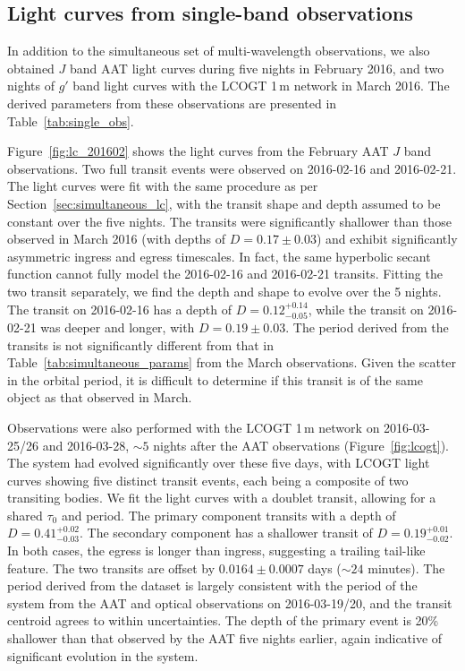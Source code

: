 \documentclass[useAMS,usenatbib]{mn2e}
\begin{document}
\subsection{Light curves from single-band observations}
\label{sec:single_band_lc}


In addition to the simultaneous set of multi-wavelength observations, we also obtained $J$ band AAT light curves during five nights in February 2016, and two nights of $g'$ band light curves with the LCOGT 1\,m network in March 2016. The derived parameters from these observations are presented in Table~\ref{tab:single_obs}. 

Figure~\ref{fig:lc_201602} shows the light curves from the February AAT $J$ band observations. Two full transit events were observed on 2016-02-16 and 2016-02-21. The light curves were fit with the same procedure as per Section~\ref{sec:simultaneous_lc}, with the transit shape and depth assumed to be constant over the five nights. The transits were significantly shallower than those observed in March 2016 (with depths of $D=0.17\pm0.03$) and exhibit significantly asymmetric ingress and egress timescales. In fact, the same hyperbolic secant function cannot fully model the 2016-02-16 and 2016-02-21 transits. Fitting the two transit separately, we find the depth and shape to evolve over the 5 nights. The transit on 2016-02-16 has a depth of $D = 0.12_{-0.05}^{+0.14}$, while the transit on 2016-02-21 was deeper and longer, with $D = 0.19\pm0.03$. The period derived from the transits is not significantly different from that in Table~\ref{tab:simultaneous_params} from the March observations. Given the scatter in the orbital period, it is difficult to determine if this transit is of the same object as that observed in March.

Observations were also performed with the LCOGT 1\,m network on 2016-03-25/26 and 2016-03-28, $\sim 5$ nights after the AAT observations (Figure~\ref{fig:lcogt}). The system had evolved significantly over these five days, with LCOGT light curves showing five distinct transit events, each being a composite of two transiting bodies. We fit the light curves with a doublet transit, allowing for a shared $\tau_0$ and period. The primary component transits with a depth of $D = 0.41_{-0.03}^{+0.02}$. The secondary component has a shallower transit of $D = 0.19_{-0.02}^{+0.01}$. In both cases, the egress is longer than ingress, suggesting a trailing tail-like feature. The two transits are offset by $0.0164 \pm 0.0007$ days ($\sim 24$ minutes). The period derived from the dataset is largely consistent with the period of the system from the AAT and optical observations on 2016-03-19/20, and the transit centroid agrees to within uncertainties. The depth of the primary event is 20\% shallower than that observed by the AAT five nights earlier, again indicative of significant evolution in the system. 
\end{document}
